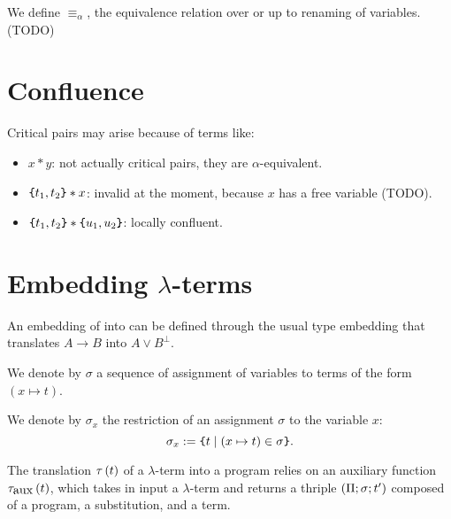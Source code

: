 \documentclass{article}
\begin{document}
\begin{definition}
    We define $\equiv_\alpha$, the equivalence relation over \clats{} or \claps{} up to renaming of variables. (TODO)
\end{definition}

\section{Confluence}
Critical pairs may arise because of terms like:
\begin{itemize}
    \item $x * y$: not actually critical pairs, they are $\alpha$-equivalent.
    \item $\mbox{\texttt{\{}}t_1, t_2\mbox{\texttt{\}}} * x$: invalid at the moment, because $x$ has a free variable (TODO).
    \item $\mbox{\texttt{\{}}t_1, t_2\mbox{\texttt{\}}} * \mbox{\texttt{\{}}u_1, u_2\mbox{\texttt{\}}}$: locally confluent.
\end{itemize}

\vspace{2em}


\section{Embedding $\lambda$-terms}

An embedding of \lats{} into \claps{} can be defined through the
usual type embedding that translates $A \to B$ into $A \vee B^\bot$.

We denote by $\sigma$ a sequence of assignment of variables to terms
of the form $(x \mapsto t)$.

We denote by $\sigma_x$ the restriction of an assignment $\sigma$
to the variable $x$:
\[\sigma_x := \mbox{\texttt{\{}}t \mid (x \mapsto t) \in \sigma\mbox{\texttt{\}}}.\]

The translation $\tau\left(t\right)$ of a $\lambda$-term into a program relies on an auxiliary function $\tau_{\mbox{aux}}\left(t\right)$, which takes
in input a $\lambda$-term and returns a thriple $(\Pi; \sigma; t')$ composed of a program, a substitution, and a term.
\end{document}
